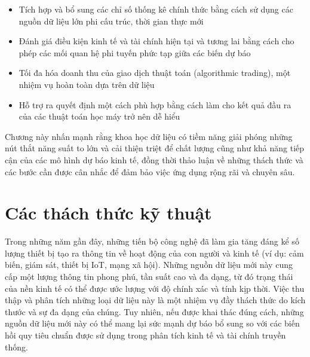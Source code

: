 \begin{itemize}
\item Tích hợp và bổ sung các chỉ số thống kê chính thức bằng cách sử dụng các nguồn dữ liệu lớn phi cấu trúc, thời gian thực mới
\item Đánh giá điều kiện kinh tế và tài chính hiện tại và tương lai bằng cách cho phép các mối quan hệ phi tuyến phức tạp giữa các biến dự báo
\item Tối đa hóa doanh thu của giao dịch thuật toán (algorithmic trading), một nhiệm vụ hoàn toàn dựa trên dữ liệu
\item Hỗ trợ ra quyết định một cách phù hợp bằng cách làm cho kết quả đầu ra của các thuật toán học máy trở nên dễ hiểu
\end{itemize}

Chương này nhấn mạnh rằng khoa học dữ liệu có tiềm năng giải phóng những nút thắt năng suất to lớn và cải thiện triệt để chất lượng cũng như khả năng tiếp cận của các mô hình dự báo kinh tế, đồng thời thảo luận về những thách thức và các bước cần được cân nhắc để đảm bảo việc ứng dụng rộng rãi và chuyên sâu.

\section{Các thách thức kỹ thuật}

Trong những năm gần đây, những tiến bộ công nghệ đã làm gia tăng đáng kể số lượng thiết bị tạo ra thông tin về hoạt động của con người và kinh tế (ví dụ: cảm biến, giám sát, thiết bị IoT, mạng xã hội). Những nguồn dữ liệu mới này cung cấp một lượng thông tin phong phú, tần suất cao và đa dạng, từ đó trạng thái của nền kinh tế có thể được ước lượng với độ chính xác và tính kịp thời. Việc thu thập và phân tích những loại dữ liệu này là một nhiệm vụ đầy thách thức do kích thước và sự đa dạng của chúng. Tuy nhiên, nếu được khai thác đúng cách, những nguồn dữ liệu mới này có thể mang lại sức mạnh dự báo bổ sung so với các biến hồi quy tiêu chuẩn được sử dụng trong phân tích kinh tế và tài chính truyền thống.

